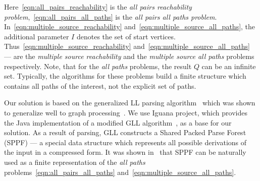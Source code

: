 Here~\ref{eqn:all_pairs_reachability} is the \textit{all pairs reachability problem},~\ref{eqn:all_pairs_all_paths} is the \textit{all pairs all paths problem}. In~\ref{eqn:multiple_source_reachability} and~\ref{eqn:multiple_source_all_paths}, the additional parameter $I$ denotes the set of start vertices. Thus~\ref{eqn:multiple_source_reachability} and~\ref{eqn:multiple_source_all_paths} --- are the \textit{multiple source reachability} and the \textit{multiple source all paths} problems respectively. Note, that for the \textit{all paths} problems, the result $Q$ can be an infinite set. Typically, the algorithms for these problems build a finite structure which contains all paths of the interest, not the explicit set of paths.                                                                                                                                                                                                                   

Our solution is based on the generalized LL parsing algorithm~\cite{SCOTT2010177} which was shown to generalize well to graph processing~\cite{Grigorev:2017:CPQ:3166094.3166104}. We use Iguana project, which provides the Java implementation of a modified GLL algorithm~\cite{10.1007/978-3-662-46663-6_5}, as a base for our solution. As a result of parsing, GLL constructs a Shared Packed Parse Forest (SPPF) --- a special data structure which represents all possible derivations of the input in a compressed form. It was shown in~\cite{Grigorev:2017:CPQ:3166094.3166104} that SPPF can be naturally used as a finite representation of the \textit{all paths} problems~\ref{eqn:all_pairs_all_paths} and~\ref{eqn:multiple_source_all_paths}.